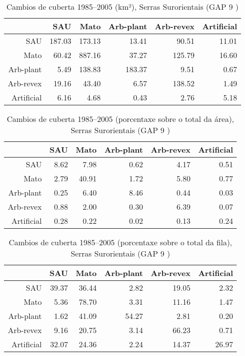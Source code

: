 \clearpage
\begin{table}[p]
\centering
\caption{Cambios de cuberta 1985--2005 (km²), Serras Surorientais (GAP 9 )} 
\label{TaboaContinxGAP9}
\begin{tabular}{rrrrrr}
  \hline
 & SAU & Mato & Arb-plant & Arb-revex & Artificial \\ 
  \hline
SAU & 187.03 & 173.13 & 13.41 & 90.51 & 11.01 \\ 
  Mato & 60.42 & 887.16 & 37.27 & 125.79 & 16.60 \\ 
  Arb-plant & 5.49 & 138.83 & 183.37 & 9.51 & 0.67 \\ 
  Arb-revex & 19.16 & 43.40 & 6.57 & 138.52 & 1.49 \\ 
  Artificial & 6.16 & 4.68 & 0.43 & 2.76 & 5.18 \\ 
   \hline
\end{tabular}
\end{table}
\begin{table}[p]
\centering
\caption{Cambios de cuberta 1985--2005 (porcentaxe sobre o total da área), Serras Surorientais (GAP 9 )} 
\label{TaboaContinxPTGAP9}
\begin{tabular}{rrrrrr}
  \hline
 & SAU & Mato & Arb-plant & Arb-revex & Artificial \\ 
  \hline
SAU & 8.62 & 7.98 & 0.62 & 4.17 & 0.51 \\ 
  Mato & 2.79 & 40.91 & 1.72 & 5.80 & 0.77 \\ 
  Arb-plant & 0.25 & 6.40 & 8.46 & 0.44 & 0.03 \\ 
  Arb-revex & 0.88 & 2.00 & 0.30 & 6.39 & 0.07 \\ 
  Artificial & 0.28 & 0.22 & 0.02 & 0.13 & 0.24 \\ 
   \hline
\end{tabular}
\end{table}
\begin{table}[p]
\centering
\caption{Cambios de cuberta 1985--2005 (porcentaxe sobre o total da fila), Serras Surorientais (GAP 9 )} 
\label{TaboaContinxPFGAP9}
\begin{tabular}{rrrrrr}
  \hline
 & SAU & Mato & Arb-plant & Arb-revex & Artificial \\ 
  \hline
SAU & 39.37 & 36.44 & 2.82 & 19.05 & 2.32 \\ 
  Mato & 5.36 & 78.70 & 3.31 & 11.16 & 1.47 \\ 
  Arb-plant & 1.62 & 41.09 & 54.27 & 2.81 & 0.20 \\ 
  Arb-revex & 9.16 & 20.75 & 3.14 & 66.23 & 0.71 \\ 
  Artificial & 32.07 & 24.36 & 2.24 & 14.37 & 26.97 \\ 
   \hline
\end{tabular}
\end{table}
